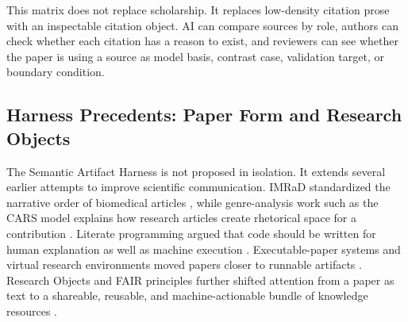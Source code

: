 \documentclass{article}
\begin{document}
This matrix does not replace scholarship. It replaces low-density citation prose with an inspectable citation object. AI can compare sources by role, authors can check whether each citation has a reason to exist, and reviewers can see whether the paper is using a source as model basis, contrast case, validation target, or boundary condition.

\subsection{Harness Precedents: Paper Form and Research Objects}
\label{sec:app_precedents}

The Semantic Artifact Harness is not proposed in isolation. It extends several earlier attempts to improve scientific communication. IMRaD standardized the narrative order of biomedical articles \citep{sollaci2004imrad}, while genre-analysis work such as the CARS model explains how research articles create rhetorical space for a contribution \citep{swales1990genre}. Literate programming argued that code should be written for human explanation as well as machine execution \citep{knuth1984literate}. Executable-paper systems and virtual research environments moved papers closer to runnable artifacts \citep{vanGorp2011share,leBorgne2011openreview}. Research Objects and FAIR principles further shifted attention from a paper as text to a shareable, reusable, and machine-actionable bundle of knowledge resources \citep{bechhofer2010researchobjects,wilkinson2016fair}.
\end{document}
